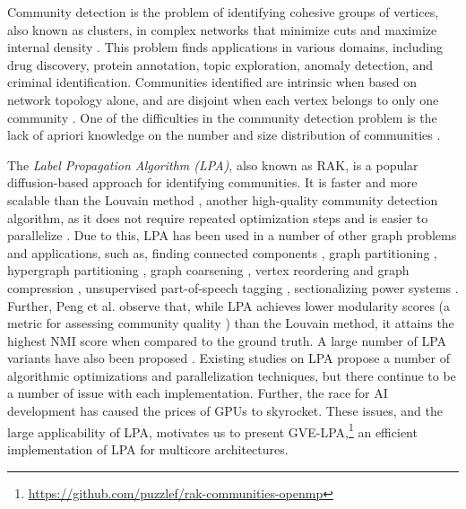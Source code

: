 Community detection is the problem of identifying cohesive groups of vertices, also known as clusters, in complex networks that minimize cuts and maximize internal density \cite{garza2019community}. This problem finds applications in various domains, including drug discovery, protein annotation, topic exploration, anomaly detection, and criminal identification. Communities identified are intrinsic when based on network topology alone, and are disjoint when each vertex belongs to only one community \cite{com-gregory10}. One of the difficulties in the community detection problem is the lack of apriori knowledge on the number and size distribution of communities \cite{com-blondel08}.

The \textit{Label Propagation Algorithm (LPA)}, also known as RAK, \cite{com-raghavan07} is a popular diffusion-based approach for identifying communities. It is faster and more scalable than the Louvain method \cite{com-blondel08}, another high-quality community detection algorithm, as it does not require repeated optimization steps and is easier to parallelize \cite{com-newman04, com-raghavan07}. Due to this, LPA has been used in a number of other graph problems and applications, such as, finding connected components \cite{stergiou2018shortcutting}, graph partitioning \cite{slota2014pulp, wang2014partition, meyerhenke2014partitioning, meyerhenke2016partitioning, meyerhenke2017parallel, bae2020label, akhremtsev2020high, slota2020scalable, zhang2020multilevel}, hypergraph partitioning \cite{henne2015label, gottesburen2021scalable}, graph coarsening \cite{valejo2020coarsening}, vertex reordering and graph compression \cite{boldi2011layered}, unsupervised part-of-speech tagging \cite{das2011unsupervised}, sectionalizing power systems \cite{aziz2023novel}. Further, Peng et al. \cite{peng2014accelerating} observe that, while LPA achieves lower modularity scores (a metric for assessing community quality \cite{com-newman04}) than the Louvain method, it attains the highest NMI score when compared to the ground truth. A large number of LPA variants have also been proposed \cite{li2015parallel, farnadi2015scalable, li2015detecting, shen2016topic, mohan2017scalable, zhang2017label, berahmand2018lp, ma2018psplpa, sattari2018spreading, zheng2018improved, xu2019distributed, zarei2020detecting, maleki2020dhlp, zhang2020lilpa, el2021wlni, roghani2021pldls, zhang2023large}. Existing studies on LPA propose a number of algorithmic optimizations and parallelization techniques, but there continue to be a number of issue with each implementation. Further, the race for AI development has caused the prices of GPUs to skyrocket. These issues, and the large applicability of LPA, motivates us to present GVE-LPA,\footnote{\url{https://github.com/puzzlef/rak-communities-openmp}} an efficient implementation of LPA for multicore architectures.

